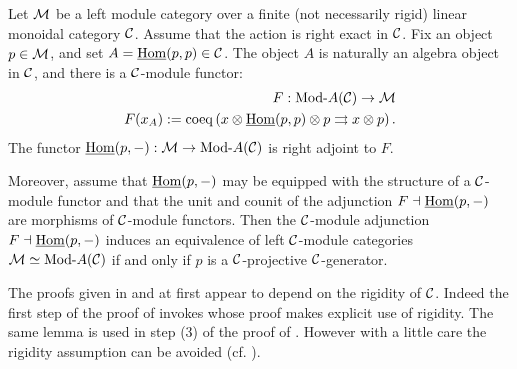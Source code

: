 \documentclass{amsart}
\begin{document}
\begin{theorem} \label{thm:C-module-Embedding} %


	Let $\mathcal M$ be a left module category over a finite (not necessarily rigid) linear monoidal category $\mathcal C$. Assume that the action is right exact in $\mathcal C$. Fix an object $p \in \mathcal M$, and set $A = \operatorname{\underline{Hom}}(p,p) \in \mathcal C$. The object $A$ is naturally an algebra object in $\mathcal C$, and there is a $\mathcal C$-module functor:
	\begin{align*}
		F:   \Mod{}{A}(\cC) \to \cM \\
		F(x_A) := \coeq \left( x \otimes \IHom(p,p) \otimes p \rightrightarrows x \otimes p \right).
	\end{align*}
The functor $\IHom(p,-): \cM \to \Mod{}{A}(\cC)$ is right adjoint to $F$. 

Moreover, assume that $\operatorname{\underline{Hom}}(p,-)$ may be equipped with the structure of a $\mathcal C$-module functor and that the unit and counit of the adjunction $F \dashv \operatorname{\underline{Hom}}(p,-)$ are morphisms of $\mathcal C$-module functors. Then the $\mathcal C$-module adjunction  $F \dashv \operatorname{\underline{Hom}}(p,-)$ induces an equivalence of left $\mathcal C$-module categories $\cM \simeq \Mod{}{A}(\cC)$ if and only if  $p$ is a $\mathcal C$-projective $\mathcal C$-generator.
\end{theorem}

\noindent The proofs given in \cite{EGNO} and \cite{MR1976459} at first appear to depend on  the rigidity of $\mathcal C$. Indeed the first step of the proof of \cite[Thm 2.11.2]{EGNO} invokes \cite[lemma 2.10.4.(4)]{EGNO} whose proof makes explicit use of rigidity. The same lemma is used in step (3) of the proof of \cite[Thm 1]{MR1976459}. However with a little care the rigidity assumption can be avoided (cf. \cite[Rmk. 2.11.3]{EGNO}).  
\end{document}
